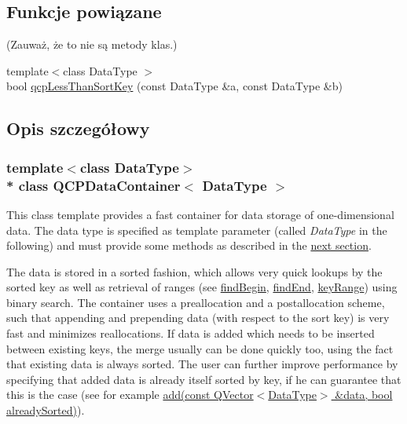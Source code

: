 \subsection*{Funkcje powiązane}
(Zauważ, że to nie są metody klas.) \begin{DoxyCompactItemize}
\item 
{\footnotesize template$<$class Data\+Type $>$ }\\bool \hyperlink{class_q_c_p_data_container_a74c5e06728cb6fa778a25d9ec0c4bd36}{qcp\+Less\+Than\+Sort\+Key} (const Data\+Type \&a, const Data\+Type \&b)
\end{DoxyCompactItemize}


\subsection{Opis szczegółowy}
\subsubsection*{template$<$class Data\+Type$>$\\*
class Q\+C\+P\+Data\+Container$<$ Data\+Type $>$}

This class template provides a fast container for data storage of one-\/dimensional data. The data type is specified as template parameter (called {\itshape Data\+Type} in the following) and must provide some methods as described in the \hyperlink{class_q_c_p_data_container_qcpdatacontainer-datatype}{next section}.

The data is stored in a sorted fashion, which allows very quick lookups by the sorted key as well as retrieval of ranges (see \hyperlink{class_q_c_p_data_container_a8ffcab551fd06dd037874ef644c73467}{find\+Begin}, \hyperlink{class_q_c_p_data_container_ad9b6b0343252eb3bbd591ee28aaa4e9d}{find\+End}, \hyperlink{class_q_c_p_data_container_aba6e1a93c21ccc56a432b4a02c9d0ed2}{key\+Range}) using binary search. The container uses a preallocation and a postallocation scheme, such that appending and prepending data (with respect to the sort key) is very fast and minimizes reallocations. If data is added which needs to be inserted between existing keys, the merge usually can be done quickly too, using the fact that existing data is always sorted. The user can further improve performance by specifying that added data is already itself sorted by key, if he can guarantee that this is the case (see for example \hyperlink{class_q_c_p_data_container_a51d2a4c9ce4baf5e950b767d26673972}{add(const Q\+Vector$<$\+Data\+Type$>$ \&data, bool already\+Sorted)}).


